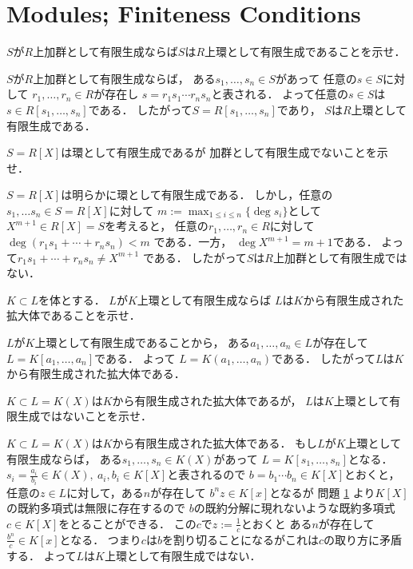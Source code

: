 \section{Modules; Finiteness Conditions}

\begin{prob}
  $S$が$R$上加群として有限生成ならば$S$は$R$上環として有限生成であることを示せ．
\end{prob}
\begin{ans}
  $S$が$R$上加群として有限生成ならば，
  ある$s_1, \dots , s_n \in S$があって
  任意の$s\in S$に対して
  $r_1, \dots, r_n \in R$が存在し
  $s = r_1 s_1 \cdots r_n s_n $と表される．
  よって任意の$s \in S$は
  $s \in R[s_1, \dots, s_n ]$である．
  したがって$S = R[s_1, \dots, s_n ]$であり，
  $S$は$R$上環として有限生成である．
\end{ans}

\begin{prob}
  $S = R[X]$は環として有限生成であるが
  加群として有限生成でないことを示せ．
\end{prob}
\begin{ans}
  $S = R[X]$は明らかに環として有限生成である．
  しかし，任意の$s_1, \dots s_n \in S = R[X]$に対して
  $ m := \max_{1 \le i \le n} \{ \deg s_i \} $として
  $X^{m+1} \in R[X] = S $を考えると，
  任意の$r_1, \dots , r_n \in R$に対して
  $ \deg ( r_1 s_1 + \cdots + r_n s_n ) < m $
  である．一方，
  $ \deg X^{m+1} = m + 1 $である．
  よって$ r_1 s_1 + \cdots + r_n s_n \ne X^{m+1} $
  である．
  したがって$S$は$R$上加群として有限生成ではない．
\end{ans}

\begin{prob}
  $K \subset L$を体とする．
  $L$が$K$上環として有限生成ならば
  $L$は$K$から有限生成された拡大体であることを示せ．
\end{prob}
\begin{ans}
  $L$が$K$上環として有限生成であることから，
  ある$a_1, \dots , a_n \in L$が存在して
  $ L = K[a_1, \dots, a_n] $である．
  よって
  $ L = K( a_1, \dots , a_n ) $である．
  したがって$L$は$K$から有限生成された拡大体である．
\end{ans}

\begin{prob}
  $K \subset L = K(X)$は$K$から有限生成された拡大体であるが，
  $L$は$K$上環として有限生成ではないことを示せ．
\end{prob}
\begin{ans}
  $K \subset L = K(X)$は$K$から有限生成された拡大体である．
  もし$L$が$K$上環として有限生成ならば，
  ある$ s_1, \dots, s_n \in K(X)$があって
  $L = K[s_1, \dots, s_n]$となる．
  $ s_i = \frac{a_i}{b_i} \in K(X), \ a_i, b_i \in K[X]$と表されるので
  $b = b_1 \cdots b_n \in K[X]$とおくと，
  任意の$z \in L$に対して，ある$n$が存在して
  $ b^n z \in K[x]$となるが
  問題 \ref{} より$K[X]$の既約多項式は無限に存在するので
  $b$の既約分解に現れないような既約多項式$c \in K[X]$をとることができる．
  この$c$で$z := \frac{1}{c}$とおくと
  ある$n$が存在して$ \frac{b^n}{c} \in K[x] $となる．
  つまり$c$は$b$を割り切ることになるがこれは$c$の取り方に矛盾する．
  よって$L$は$K$上環として有限生成ではない．
\end{ans}
